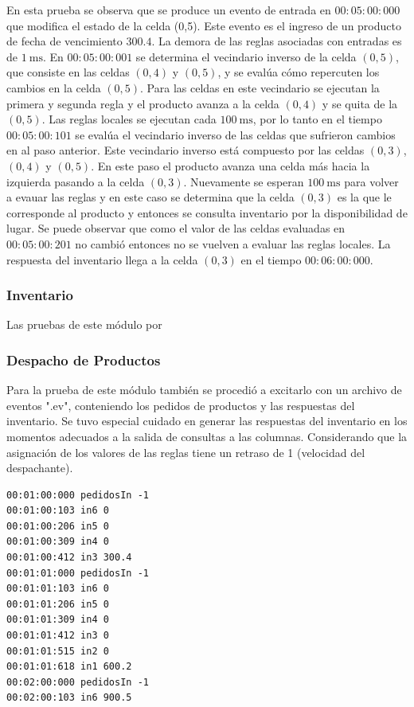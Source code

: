 \documentclass[10pt]{article}
\begin{document}
En esta prueba se observa que se produce un evento de entrada en $00:05:00:000$ que modifica el estado de la celda (0,5). Este evento es el ingreso de un producto de fecha de vencimiento $300.4$. La demora de las reglas asociadas con entradas es de $1~\textrm{ms}$. En $00:05:00:001$ se determina el vecindario inverso de la celda $(0,5)$, que consiste en las celdas $(0,4)$ y $(0,5)$, y se evalúa cómo repercuten los cambios en la celda $(0,5)$. Para las celdas en este vecindario se ejecutan la primera y segunda regla y el producto avanza a la celda $(0,4)$ y se quita de la $(0,5)$. Las reglas locales se ejecutan cada $100~\textrm{ms}$, por lo tanto en el tiempo $00:05:00:101$ se evalúa el vecindario inverso de las celdas que sufrieron cambios en al paso anterior. Este vecindario inverso está compuesto por las celdas $(0,3)$, $(0,4)$ y $(0,5)$. En este paso el producto avanza una celda más hacia la izquierda pasando a la celda $(0,3)$. Nuevamente se esperan $100~\textrm{ms}$ para volver a evauar las reglas y en este caso se determina que la celda $(0,3)$ es la que le corresponde al producto y entonces se consulta inventario por la disponibilidad de lugar. Se puede observar que como el valor de las celdas evaluadas en $00:05:00:201$ no cambió entonces no se vuelven a evaluar las reglas locales. La respuesta del inventario llega a la celda $(0,3)$ en el tiempo $00:06:00:000$.

\subsubsection{Inventario}
Las pruebas de este módulo por

\subsubsection{Despacho de Productos}
Para la prueba de este módulo también se procedió a excitarlo con un archivo de eventos ".ev", conteniendo los pedidos de productos y las respuestas del inventario. Se tuvo especial cuidado en generar las respuestas del inventario en los momentos adecuados a la salida de consultas a las columnas. Considerando que la asignación de los valores de las reglas tiene un retraso de 1 (velocidad del despachante).

\begin{minipage}{1\textwidth}
	\centering
	\begin{lstlisting}
00:01:00:000 pedidosIn -1
00:01:00:103 in6 0
00:01:00:206 in5 0
00:01:00:309 in4 0
00:01:00:412 in3 300.4
00:01:01:000 pedidosIn -1
00:01:01:103 in6 0
00:01:01:206 in5 0
00:01:01:309 in4 0
00:01:01:412 in3 0
00:01:01:515 in2 0
00:01:01:618 in1 600.2
00:02:00:000 pedidosIn -1
00:02:00:103 in6 900.5
	\end{lstlisting}	
\end{minipage}
\end{document}
